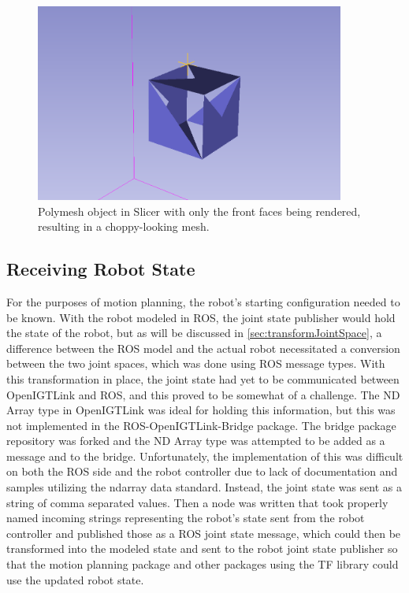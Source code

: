 \documentclass[12pt]{report}
\begin{document}
\begin{figure}[thpb]
	\centering
	\includegraphics[width=4in]{images/jagged_slicer_mesh.png}
    \caption{Polymesh object in Slicer with only the front faces being rendered, resulting in a choppy-looking mesh.}
    \label{fig:cubeMeshConversionBadView}
\end{figure}

\subsection{Receiving Robot State}
\label{sec:receivingRobotState}
For the purposes of motion planning, the robot's starting configuration needed to be known. With the robot modeled in ROS, the joint state publisher would hold the state of the robot, but as will be discussed in \autoref{sec:transformJointSpace}, a difference between the ROS model and the actual robot necessitated a conversion between the two joint spaces, which was done using ROS message types. With this transformation in place, the joint state had yet to be communicated between OpenIGTLink and ROS, and this proved to be somewhat of a challenge. The ND Array type in OpenIGTLink was ideal for holding this information, but this was not implemented in the ROS-OpenIGTLink-Bridge package. The bridge package repository was forked and the ND Array type was attempted to be added as a message and to the bridge. Unfortunately, the implementation of this was difficult on both the ROS side and the robot controller due to lack of documentation and samples utilizing the ndarray data standard. Instead, the joint state was sent as a string of comma separated values. Then a node was written that took properly named incoming strings representing the robot's state sent from the robot controller and published those as a ROS joint state message, which could then be transformed into the modeled state and sent to the robot joint state publisher so that the motion planning package and other packages using the TF library could use the updated robot state.
\end{document}
